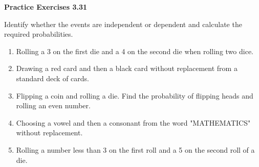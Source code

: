 \vspace{0.3ex}
\noindent\textbf{Practice Exercises 3.31}

\vspace{0.2ex}

Identify whether the events are independent or dependent and calculate the required probabilities.

\begin{enumerate}[label=\color{blue}\arabic*.]
    \item Rolling a 3 on the first die and a 4 on the second die when rolling two dice.
    \item Drawing a red card and then a black card without replacement from a standard deck of cards.

    \item Flipping a coin and rolling a die. Find the probability of flipping heads and rolling an even number.
    \item Choosing a vowel and then a consonant from the word "MATHEMATICS" without replacement.
    \item Rolling a number less than 3 on the first roll and a 5 on the second roll of a die.
\end{enumerate}
